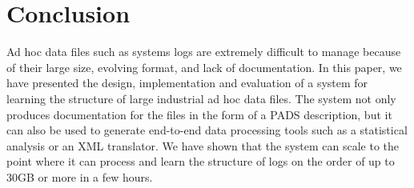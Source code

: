 \documentclass{acm_proc_article-sp}
\begin{document}















\section{Conclusion}
\label{sec:conclude}
Ad hoc data files such as systems logs 
are extremely difficult to manage because of their large size,
evolving format, and lack of documentation.
In this paper, we have presented the design, implementation and
evaluation of a system for learning the structure of 
large industrial ad hoc data files.  The system not only
produces documentation for the files in the form of a PADS
description, but it can also be used to generate end-to-end
data processing tools such as a statistical analysis or an
XML translator.  We have shown that the system
can scale to the point where it can process and learn the
structure of logs on the order of up to 30GB or more in 
a few hours.



\end{document}
